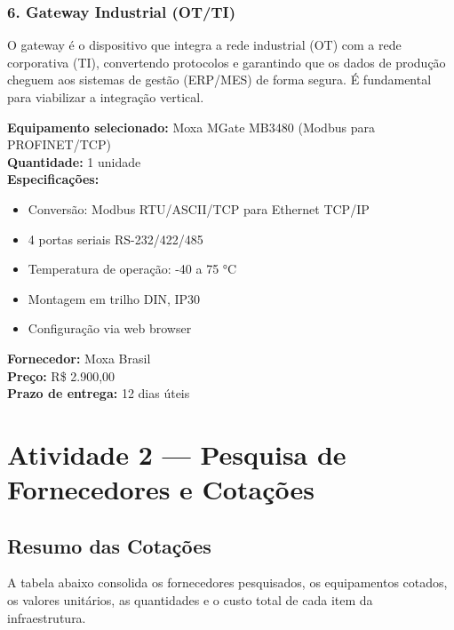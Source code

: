 \documentclass[12pt,a4paper]{article}
\begin{document}
\subsubsection*{6. Gateway Industrial (OT/TI)}

O gateway é o dispositivo que integra a rede industrial (OT) com a rede corporativa (TI),
convertendo protocolos e garantindo que os dados de produção cheguem aos sistemas
de gestão (ERP/MES) de forma segura. É fundamental para viabilizar a integração vertical.

\textbf{Equipamento selecionado:} Moxa MGate MB3480 (Modbus para PROFINET/TCP)\\
\textbf{Quantidade:} 1 unidade\\
\textbf{Especificações:}
\begin{itemize}[leftmargin=1.5cm, itemsep=1pt]
    \item Conversão: Modbus RTU/ASCII/TCP para Ethernet TCP/IP
    \item 4 portas seriais RS-232/422/485
    \item Temperatura de operação: -40 a 75 °C
    \item Montagem em trilho DIN, IP30
    \item Configuração via web browser
\end{itemize}
\textbf{Fornecedor:} Moxa Brasil\\
\textbf{Preço:} R\$ 2.900,00\\
\textbf{Prazo de entrega:} 12 dias úteis

\section{Atividade 2 --- Pesquisa de Fornecedores e Cotações}

\subsection{Resumo das Cotações}

A tabela abaixo consolida os fornecedores pesquisados, os equipamentos cotados, os
valores unitários, as quantidades e o custo total de cada item da infraestrutura.
\end{document}
